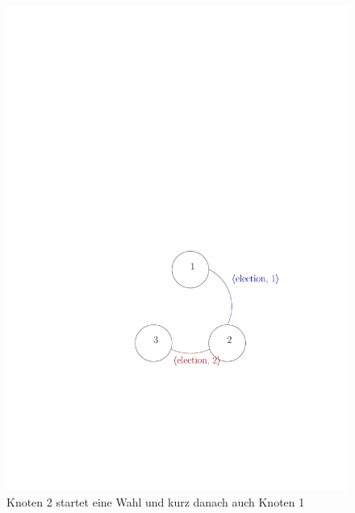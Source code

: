 \begin{figure}
  \begin{center}
    \includegraphics{./pics/9_1_1}
  \end{center}
  \caption{Knoten 2 startet eine Wahl und kurz danach auch Knoten 1}
  \label{fig:9_1_1}
\end{figure}

